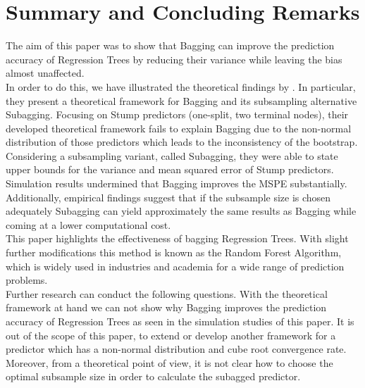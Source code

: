 \section{Summary and Concluding Remarks}
The aim of this paper was to show that Bagging can improve the prediction accuracy of Regression Trees by reducing their variance while leaving the bias almost unaffected.\\
In order to do this, we have illustrated the theoretical findings by \cite{Buhlmann2002}.
In particular, they present a theoretical framework for Bagging and its subsampling alternative Subagging.
Focusing on Stump predictors (one-split, two terminal nodes), their developed theoretical framework fails to explain Bagging due to the non-normal distribution of those predictors which leads to the inconsistency of the bootstrap. %
Considering a subsampling variant, called Subagging, they were able to state upper bounds for the variance and mean squared error of Stump predictors. \\
Simulation results undermined that Bagging improves the MSPE substantially. Additionally, empirical findings suggest that if the subsample size is chosen adequately Subagging can yield approximately the same results as Bagging while coming at a lower computational cost.\\
This paper highlights the effectiveness of bagging Regression Trees. With slight further modifications this method is known as the Random Forest Algorithm, which is widely used in industries and academia for a wide range of prediction problems.%
\\
Further research can conduct the following questions.
With the theoretical framework at hand we can not show why Bagging improves the prediction accuracy of Regression Trees as seen in the simulation studies of this paper.
It is out of the scope of this paper, to extend or develop another framework for a predictor which has a non-normal distribution and cube root convergence rate.
Moreover, from a theoretical point of view, it is not clear how to choose the optimal subsample size in order to calculate the subagged predictor.
















